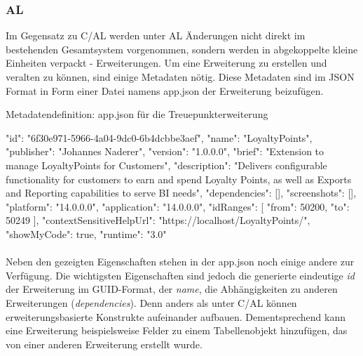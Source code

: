 \pagebreak
\subsubsection{AL}

Im Gegensatz zu C/AL werden unter AL Änderungen nicht direkt im bestehenden Gesamtsystem vorgenommen, sondern werden in abgekoppelte kleine Einheiten verpackt - Erweiterungen. Um eine Erweiterung zu erstellen und veralten zu können, sind einige Metadaten nötig. Diese Metadaten sind im JSON Format in Form einer Datei namens app.json der Erweiterung beizufügen. 

\begin{program}[H]  %
	\centering
	\caption{Metadatendefinition: app.json für die Treuepunkterweiterung}
	\label{prog:PointEntryValidation}
	\begin{JavaCode}
{
	"id": "6f30e971-5966-4a04-9dc0-6b4dcbbe3aef",
	"name": "LoyaltyPoints",
	"publisher": "Johannes Naderer",
	"version": "1.0.0.0",
	"brief": "Extension to manage LoyaltyPoints for Customers",
	"description": "Delivers configurable functionality for customers to earn and spend Loyalty Points, as well as Exports and Reporting capabilities to serve BI needs",
	"dependencies": [],
	"screenshots": [],
	"platform": "14.0.0.0",
	"application": "14.0.0.0",
	"idRanges": [
	{
		"from": 50200,
		"to": 50249
	}
	],
	"contextSensitiveHelpUrl": "https://localhost/LoyaltyPoints/",
	"showMyCode": true,
	"runtime": "3.0"
}
	\end{JavaCode}
\end{program}

\paragraph{}
Neben den gezeigten Eigenschaften stehen in der app.json noch einige andere zur Verfügung. Die wichtigsten Eigenschaften sind jedoch die generierte eindeutige \textit{id} der Erweiterung im GUID-Format, der \textit{name}, die Abhängigkeiten zu anderen Erweiterungen (\textit{dependencies}). Denn anders als unter C/AL können erweiterungsbasierte Konstrukte aufeinander aufbauen. Dementsprechend kann eine Erweiterung beispielsweise Felder zu einem Tabellenobjekt hinzufügen, das von einer anderen Erweiterung erstellt wurde.
\linebreak

